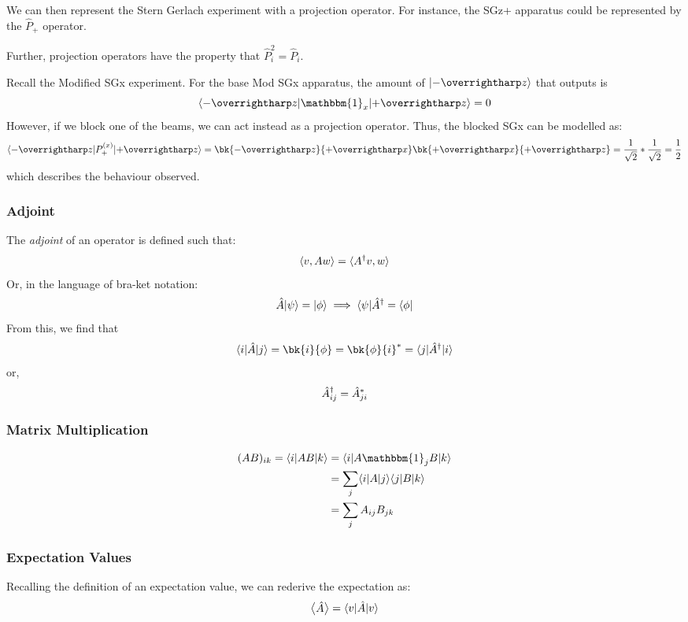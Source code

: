 We can then represent the Stern Gerlach experiment with a projection operator. For instance, the SGz+ apparatus could be represented by the \(\hat{P}_+\) operator. 

Further, projection operators have the property that \(\hat P_i ^2= \hat P_i\).

\begin{aside}
	Recall the Modified SGx experiment. For the base Mod SGx apparatus, the amount of \(\k{-\vv z}\) that outputs is
	\[\b{-\vv z}\mathbbm{1}_x\k{+\vv z}= 0\]
	However, if we block one of the beams, we can act instead as a projection operator. Thus, the blocked SGx can be modelled as:
	\[\b{-\vv z} P^{(x)}_+\k{+\vv z} = \bk{-\vv z}{+\vv x}\bk{+\vv x}{+\vv z}=\frac{1}{\sqrt{2}}*\frac{1}{\sqrt{2}}=\frac{1}{2}\]
	which describes the behaviour observed.	
\end{aside}

\subsubsection{Adjoint}
The \emph{adjoint} of an operator is defined such that:
\[\langle v, A w\rangle = \langle A^{\dagger} v, w\rangle\]
Or, in the language of bra-ket notation:
\begin{equation}
	\hat{A}\lvert\psi\rangle =\lvert\phi\rangle\implies \langle\psi\rvert\hat{A}^{\dagger}=\langle\phi\rvert \label{eq2:adj}
\end{equation}
From this, we find that 
\[\b{i}\hat{A}\k{j}=\bk{i}{\f}=\bk{\f}{i}\ast=\b{j}\hat{A}\adj\k{i}\]
or,
\begin{equation}
	\hat A\adj_{ij} = \hat A _{ji}\ast \label{eq2:complexconj}
\end{equation}

\subsubsection{Matrix Multiplication}
\begin{align}
	(AB)_{ik}=\b{i}AB\k{k}&=\b{i}A\mathbbm{1}_j B\k{k}\nonumber\\
		    &=\sum_j \b{i}A\k{j}\b{j}B\k{k}\nonumber\\
		    &=\sum_j A_{ij}B_{jk}
\end{align}

\subsubsection{Expectation Values}
Recalling the definition of an expectation value, we can rederive the expectation as:
\begin{equation}
	\left\langle \begin{matrix}\hat{A}\end{matrix} \right\rangle=\langle v\rvert\hat{A}\lvert v\rangle \label{eq2:expval}
\end{equation}

